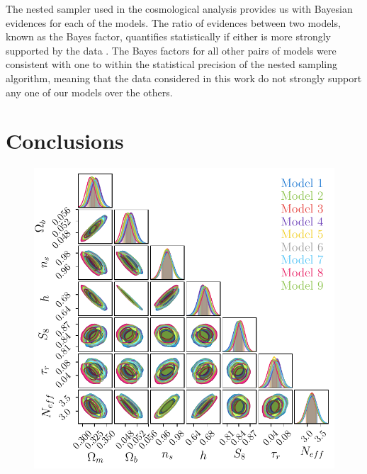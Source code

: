 \qquad The nested sampler used in the cosmological analysis provides us with Bayesian evidences for each of the models. The ratio of evidences between two models, known as the Bayes factor, quantifies statistically if either is more strongly supported by the data \citep{1995BayesFactor}. The Bayes factors for all other pairs of models were consistent with one to within the statistical precision of the nested sampling algorithm, meaning that the data considered in this work do not strongly support any one of our models over the others.

\section{Conclusions}
\begin{figure}
\begin{center}
\includegraphics[width=\columnwidth]{Neutrino-FIGS/LCDM_Params_prl_alt.pdf}

\end{center}
\end{figure}
